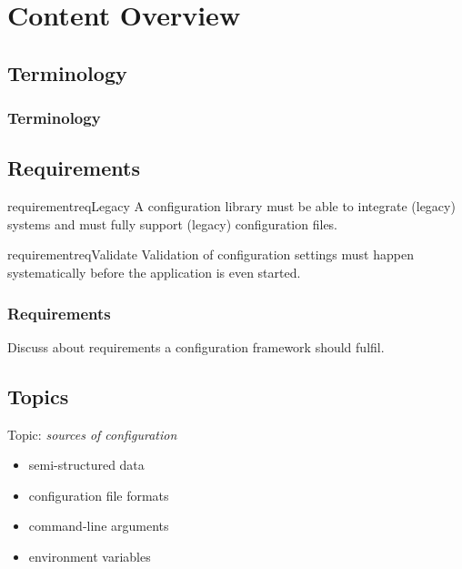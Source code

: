 \documentclass{beamer}
\begin{document}
\section{Content Overview}

\subsection{Terminology}
\begin{frame}
	\frametitle{Terminology}
	
\end{frame}

\subsection{Requirements}
\begin{frame}
\begin{restatable}{requirement}{reqLegacy}
A configuration library must be able to integrate (legacy) systems and must fully support (legacy) configuration files.%
\label{req:legacy}
\end{restatable}

\begin{restatable}{requirement}{reqValidate}
Validation of configuration settings must happen systematically before the application is even started.
\end{restatable}
\end{frame}

\begin{assignment}
	\frametitle{Requirements}
	\begin{task}
	Discuss about requirements a configuration framework should fulfil.
	\end{task}
\end{assignment}

\subsection{Topics}
\begin{frame}
	Topic: \textit{sources of configuration}
	\begin{itemize}
		\item semi-structured data
		\item configuration file formats
		\item command-line arguments
		\item environment variables
	\end{itemize}
\end{frame}
\end{document}
